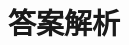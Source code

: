 \documentclass[../../main.tex]{subfiles}
\begin{document}
\section{答案解析}


\answer{\qone} %
\answer{\qtwo} %
 
\end{document}

